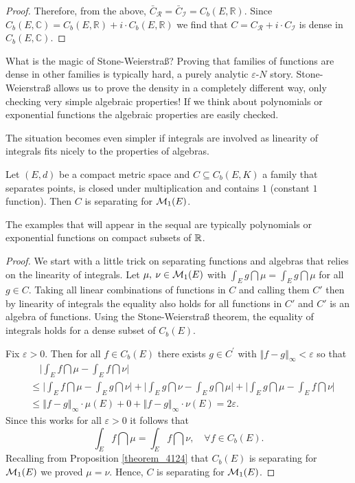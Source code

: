 \begin{proof}[Proof]
	Therefore, from the above, $\bar{C}_{\mathcal R} = \bar{C}_{\mathcal I} = C_b(E,\mathbb{R})$. Since $C_b(E, \mathbb{C}) = C_b(E,\mathbb{R}) + i \cdot C_b(E,\mathbb{R})$ we find that $C = C_{\mathcal{R}} + i \cdot C_{\mathcal{I}}$ is dense in $C_b(E, \mathbb{C})$.
\end{proof}
What is the magic of Stone-Weierstra\ss? Proving that families of functions are dense in other families is typically hard, a purely analytic $\varepsilon$-$N$ story. Stone-Weierstra\ss{} allows us to prove the density in a completely different way, only checking very simple algebraic properties! If we think about polynomials or exponential functions the algebraic properties are easily checked.\smallskip
\marginpar{\textcolor{red}{Lecture 15}}

The situation becomes even simpler if integrals are involved as linearity of integrals fits nicely to the properties of algebras.
\begin{llemma}
\begin{corollary}\label{cor_514}
	Let $(E,d)$ be a compact metric space and $C \subseteq C_b(E,K)$ a family that separates points, is closed under multiplication and contains $1$ (constant $1$ function). Then $C$ is separating for $\mathcal{M}_1(E)$.
\end{corollary}
\end{llemma}
The examples that will appear in the sequal are typically polynomials or exponential functions on compact subsets of $\mathbb{R}$.
\begin{proof}[Proof]
	We start with a little trick on separating functions and algebras that relies on the linearity of integrals. Let $\mu,\: \nu \in \mathcal{M}_1(E)$ with $\int_E g \dint \mu = \int_E g \dint \mu$ for all $g \in C$. Taking all linear combinations of functions in $C$ and calling them $C'$ then by linearity of integrals the equality also holds for all functions in $C'$ and $C'$ is an algebra of functions. Using the Stone-Weierstra\ss{} theorem, the equality of integrals holds for a dense subset of $C_b(E)$.
	\smallskip
	
	Fix $\varepsilon>0$. Then for all $f \in C_b(E)$ there exists $g \in C^{\prime}$ with $\left\Vert f - g \right\Vert_{\infty} < \varepsilon$ so that 
	\begin{align*}
		&\quad\Big| \int_E f \dint  \mu - \int_E f \dint \nu \Big|  \\ 
		&\leq \Big| \int_E f \dint \mu - \int_E g \dint \nu \Big| + \Big| \int_E g \dint \nu - \int_E g \dint \mu \Big| + \Big| \int_E g \dint \mu - \int_E f \dint \nu \Big| \\
		&\leq \left\Vert f - g \right\Vert_{\infty} \cdot \mu(E) + 0 + \left\Vert f - g \right\Vert_{\infty} \cdot \nu(E) = 2 \varepsilon.
	\end{align*}
	Since this works for all $\varepsilon > 0$ it follows that $$\int_E f \dint \mu = \int_E f \dint \nu,\quad \forall f\in C_b(E).$$ Recalling from Proposition \ref{theorem_4124} that $C_b(E)$ is separating for $\mathcal{M}_1(E)$ we proved $\mu = \nu$. Hence, $C$ is separating for $\mathcal{M}_1(E)$.
\end{proof}

